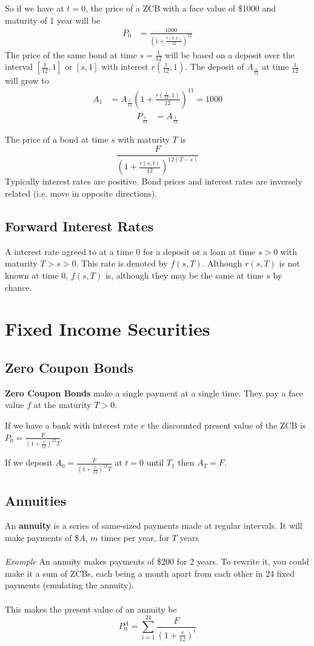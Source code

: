 \documentclass[12pt,letterpaper, twocolumn]{article}
\begin{document}
So if we have at $t=0$, the price of a ZCB with a face value of \$1000 and maturity of 1 year will be
\begin{align*}
    P_0 &= \frac{1000}{(1+\frac{r(0,1)}{12})^{12}}
\end{align*}
The price of the same bond at time $s=\frac{1}{12}$ will be based on a deposit over the interval $[\frac{1}{12},1]$ or $[s,1]$ with interest $r(\frac{1}{12},1)$. The deposit of $A_{\frac{1}{12}}$ at time $\frac{1}{12}$ will grow to 
\begin{align*}
    A_1 &= A_{\frac{1}{12}}\left(1+\frac{r(\frac{1}{12},1)}{12}\right)^{11} = 1000
\end{align*}
\begin{align*}
    P_{\frac{1}{12}} &= A_{\frac{1}{12}}
\end{align*}

The price of a bond at time $s$ with maturity $T$ is 
\[
    \frac{F}{\left( 1+ \frac{r(s,t)}{12} \right)^{12(T-s)}}
\]
Typically interest rates are positive. Bond prices and interest rates are inversely related (i.e. move in opposite directions).

\subsection{Forward Interest Rates}
A interest rate agreed to at a time 0 for a deposit or a loan at time $s>0$ with maturity $T>s>0$. This rate is denoted by $f(s, T)$. Although $r(s, T)$ is not known at time 0, $f(s, T)$ is, although they may be the same at time $s$ by chance.  


\section{Fixed Income Securities}
\subsection{Zero Coupon Bonds}
\textbf{Zero Coupon Bonds} make a single payment at a single time. They pay a face value $f$ at the maturity $T>0$. 

If we have a bank with interest rate $r$ the discounted present value of the ZCB is $P_0 = \frac{F}{(1+\frac{r}{12})^12T}$. 

If we deposit $A_0 = \frac{F}{(1+\frac{r}{12})^12T}$ at $t=0$ until $T_1$ then $A_T = F$. 

\subsection{Annuities}
An \textbf{annuity} is a series of same-sized payments made at regular intervals. It will make payments of \$$A$, $m$ times per year, for $T$ years
\\\\
\textit{Example}
An annuity makes payments of \$200 for 2 years. To rewrite it, you could make it a sum of ZCBs, each being a month apart from each other in 24 fixed payments (emulating the annuity). 
\\\\
This makes the present value of an annuity be
 \[P_0^A = \sum_{i=1}^{24}\frac{F}{(1+\frac{r}{12})^i}\]
\end{document}
